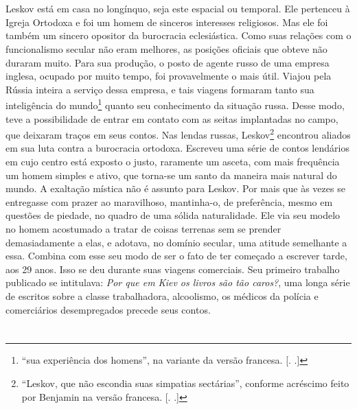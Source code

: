 \section{}

Leskov está em casa no longínquo, seja este espacial ou temporal. Ele
pertenceu à Igreja Ortodoxa e foi um homem de sinceros interesses
religiosos. Mas ele foi também um sincero opositor da burocracia
eclesiástica. Como suas relações com o funcionalismo secular não eram
melhores, as posições oficiais que obteve não duraram muito. Para sua
produção, o posto de agente russo de uma empresa inglesa, ocupado
por muito tempo, foi provavelmente o mais útil. Viajou pela Rússia
inteira a serviço dessa empresa, e tais viagens formaram tanto sua
inteligência do mundo\footnote{``sua experiência dos homens'', na
  variante da versão francesa. [. .]} quanto seu conhecimento
da situação russa. Desse modo, teve a possibilidade de entrar em contato
com as seitas implantadas no campo, que deixaram traços em seus contos.
Nas lendas russas, Leskov\footnote{``Leskov, que não escondia suas
  simpatias sectárias'', conforme acréscimo feito por Benjamin na
  versão francesa. [. .]} encontrou aliados em sua luta contra
a burocracia ortodoxa. Escreveu uma série de contos lendários em cujo
centro está exposto o justo, raramente um asceta, com mais frequência um
homem simples e ativo, que torna-se um santo da maneira mais natural do
mundo. A exaltação mística não é assunto para Leskov. Por mais que às
vezes se entregasse com prazer ao maravilhoso, mantinha-o, de
preferência, mesmo em questões de piedade, no quadro de uma sólida
naturalidade. Ele via seu modelo no homem acostumado a tratar de coisas
terrenas sem se prender demasiadamente a elas, e adotava, no domínio
secular, uma atitude semelhante a essa. Combina com esse seu modo de ser
o fato de ter começado a escrever tarde, aos 29 anos. Isso se deu durante
suas viagens comerciais. Seu primeiro trabalho publicado se intitulava:
\emph{Por que em Kiev os livros são tão caros?}, uma longa série de escritos
sobre a classe trabalhadora, alcoolismo, os médicos da
polícia e comerciários desempregados precede seus contos.

\section{}

